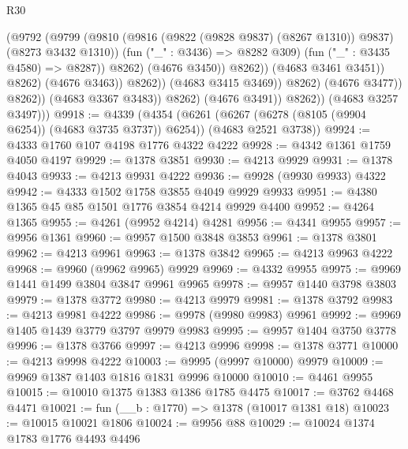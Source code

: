 \begin{lexlean}{R30}
\begin{coremodule}
                                            (@9792
                                              (@9799
                                                (@9810
                                                  (@9816 (@9822 (@9828 @9837) (@8267 @1310)) @9837)
                                                  (@8273 @3432 @1310))
                                                (fun ("_" : @3436) => @8282 @309)
                                                (fun ("_" : @3435 @4580) => @8287))
                                              @8262)
                                            (@4676 @3450))
                                          @8262))
                                      (@4683 @3461 @3451))
                                    @8262)
                                  (@4676 @3463))
                                @8262))
                            (@4683 @3415 @3469))
                          @8262)
                        (@4676 @3477))
                      @8262))
                  (@4683 @3367 @3483))
                @8262)
              (@4676 @3491))
            @8262))
        (@4683 @3257 @3497)))
@9918 := @4339
    (@4354
      (@6261 (@6267 (@6278 (@8105 (@9904 @6254)) (@4683 @3735 @3737)) @6254))
      (@4683 @2521 @3738))
@9924 := @4333 @1760 @107 @4198 @1776 @4322 @4222
@9928 := @4342 @1361 @1759 @4050 @4197
@9929 := @1378 @3851
@9930 := @4213 @9929
@9931 := @1378 @4043
@9933 := @4213 @9931 @4222
@9936 := @9928 (@9930 @9933) @4322
@9942 := @4333 @1502 @1758 @3855 @4049 @9929 @9933
@9951 := @4380 @1365 @45 @85 @1501 @1776 @3854 @4214 @9929 @4400
@9952 := @4264 @1365
@9955 := @4261 (@9952 @4214) @4281
@9956 := @4341 @9955
@9957 := @9956 @1361
@9960 := @9957 @1500 @3848 @3853
@9961 := @1378 @3801
@9962 := @4213 @9961
@9963 := @1378 @3842
@9965 := @4213 @9963 @4222
@9968 := @9960 (@9962 @9965) @9929
@9969 := @4332 @9955
@9975 := @9969 @1441 @1499 @3804 @3847 @9961 @9965
@9978 := @9957 @1440 @3798 @3803
@9979 := @1378 @3772
@9980 := @4213 @9979
@9981 := @1378 @3792
@9983 := @4213 @9981 @4222
@9986 := @9978 (@9980 @9983) @9961
@9992 := @9969 @1405 @1439 @3779 @3797 @9979 @9983
@9995 := @9957 @1404 @3750 @3778
@9996 := @1378 @3766
@9997 := @4213 @9996
@9998 := @1378 @3771
@10000 := @4213 @9998 @4222
@10003 := @9995 (@9997 @10000) @9979
@10009 := @9969 @1387 @1403 @1816 @1831 @9996 @10000
@10010 := @4461 @9955
@10015 := @10010 @1375 @1383 @1386 @1785 @4475
@10017 := @3762 @4468 @4471
@10021 := fun (__b : @1770) => @1378 (@10017 @1381 @18)
@10023 := @10015 @10021 @1806
@10024 := @9956 @88
@10029 := @10024 @1374 @1783 @1776 @4493 @4496

\end{coremodule}
\end{lexlean}
